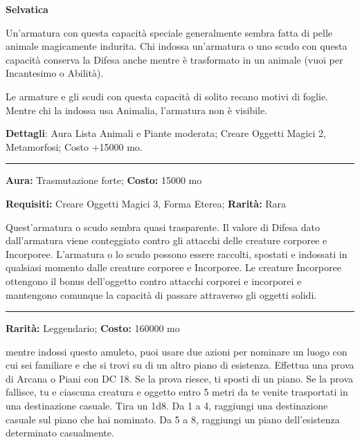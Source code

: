 \documentclass[a4paper,twoside,openany]{book}
\begin{document}
\smallskip* \textbf{Selvatica}\hypertarget{Selvatica}{}

Un'armatura con questa capacità speciale generalmente sembra fatta di pelle animale magicamente indurita. Chi indossa un'armatura o uno scudo con questa capacità conserva la Difesa anche mentre è trasformato in un animale (vuoi per Incantesimo o Abilità).

Le armature e gli scudi con questa capacità di solito recano motivi di foglie. Mentre chi la indossa usa Animalia, l'armatura non è visibile.

\textbf{Dettagli}: Aura Lista Animali e Piante moderata; Creare Oggetti Magici 2, Metamorfosi; Costo +15000 mo.

\smallskip\noindent\rule{\linewidth}{2pt}  \hypertarget{ToccoFantasma}{}\medskip{}\noindent\label{ToccoFantasma}

\textbf{Aura:} Trasmutazione forte; \textbf{Costo:} 15000 mo

\textbf{Requisiti:} Creare Oggetti Magici 3, Forma Eterea; \textbf{Rarità:} Rara


Quest'armatura o scudo sembra quasi trasparente. Il valore di Difesa dato dall'armatura viene conteggiato contro gli attacchi delle creature corporee e Incorporee. L'armatura o lo scudo possono essere raccolti, spostati e indossati in qualsiasi momento dalle creature corporee e Incorporee. Le creature Incorporee ottengono il bonus dell'oggetto contro attacchi corporei e incorporei e mantengono comunque la capacità di passare attraverso gli oggetti solidi.


\smallskip\noindent\rule{\linewidth}{2pt}  \hypertarget{AmuletodeiPiani}{}\medskip{}\noindent\label{AmuletodeiPiani}

\textbf{Rarità:} Leggendario; \textbf{Costo:} 160000 mo

mentre indossi questo amuleto, puoi usare due azioni per nominare un luogo con cui sei familiare e che si trovi su di un altro piano di esistenza. Effettua una prova di Arcana o Piani con DC 18. Se la prova riesce, ti sposti di un piano. Se la prova fallisce, tu e ciascuna creatura e oggetto entro 5 metri da te venite trasportati in una destinazione casuale. Tira un 1d8. Da 1 a 4, raggiungi una destinazione casuale sul piano che hai nominato. Da 5 a 8, raggiungi un piano dell'esistenza determinato casualmente.
\end{document}
